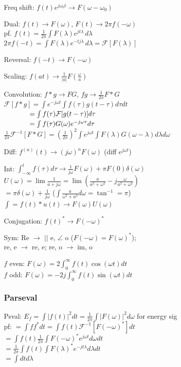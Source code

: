 \documentclass[4pt]{article}
\theoremstyle{definition}
\theoremstyle{definition}
\renewcommand{\o}{\omega}
\newcommand{\ra}{\rightarrow}
\begin{document}
\begin{landscape}
\begin{multicols}{3}
    Freq shift: \(f(t) e^{j\omega_0 t} \ra F(\omega - \omega_0)\)  %

    Dual: \(f(t) \ra F(\omega)\), \(F(t) \ra 2\pi f(-\omega)\)\\ 
    pf. \(f(t) = \frac 1 {2\pi} \int F(\lambda) e^{jt\lambda}\, d\lambda\)\\
    \(2\pi f(-t) = \int F(\lambda) e^{-tj\lambda}\, d\lambda = \mathcal{F}[F(\lambda)]\)

    Reversal: \(f(-t)\ra F(-\o)\)

    Scaling: \(f(at)\ra \frac{1}{|a|}F(\frac{\o}{a})\)   %

    Convolution: \(f*g \ra FG\), \(fg \ra \frac{1}{2\pi} F*G\)\\
    \(\mathcal F[f*g] = \int e^{-j\o t} \int f(\tau) g(t-\tau)d\tau dt\)\\
    \(\hspace{3.75em}=\int f(\tau) \mathcal F[g(t-\tau)]  d\tau \)\\
    \(\hspace{3.75em}= \int f(\tau) G(\o)e^{-j\o\tau}d\tau\)
    \( \frac{1}{2\pi} \mathcal{F}^{-1}[F * G] = (\frac{1}{2\pi})^2 \int e^{j\o t} \int F(\lambda) G(\o - \lambda) d\lambda d\o\)

    Diff: \(f^{(n)}(t) \ra (j\o)^nF(\o)\) (diff $e^{j\o t}$)    %
    
    Int: \(\int_{-\infty}^t f(\tau)d\tau \ra \frac{1}{j\o}F(\o) + \pi F(0) \delta(\o)\)\\
    \(U(\o) = \lim \frac{1}{a+j\o} = \lim (\frac{a}{a^2+\o^2} - j\frac{\o}{a^2+\o^2}) \) \\
    \(= \pi\delta(\o) + \frac{1}{j\o}\) ($\int \frac{a}{\o^2+a^2}d\o = \tan^{-1}=\pi$)\\
    $\int = f(t) * u(t) \ra F(\o)U(\o)$

    Conjugation: \(f(t)^* \ra F(-\o)^*\)   %

    Sym: Re $\ra$ $||$ e, $\angle$ o ($F(-\o) = F(\o)^*$);\\
    re, e $\ra$ re, e; re, o $\ra$ im, o

    $f$ even: \(F(\o) = 2\int_0^{\infty} f(t)\cos(\o t) dt\)\\
    $f$ odd: \(F(\o) = -2j\int_0^{\infty} f(t) \sin(\o t) dt\)
\newpage
\subsubsection*{Parseval}
    Psval: \(E_f = \int |f(t)|^2 dt = \frac{1}{2\pi} \int |F(\omega)|^2 d\o\)  for energy sig\\  %
    pf: \(= \int f f^* dt = \int f(t)\mathcal F ^{-1}[F(-\o)^*]dt\)\\
    \(= \int f(t) \frac{1}{2\pi} \int F(-\o)^* e^{j\o t} d\o dt\)\\
    \(= \frac{1}{2\pi}\int f(t) \int F(\lambda)^* e^{-jt\lambda} d\lambda dt \)\\
    \(= \int dt d\lambda\)


\end{multicols}
\end{landscape}
\end{document}
